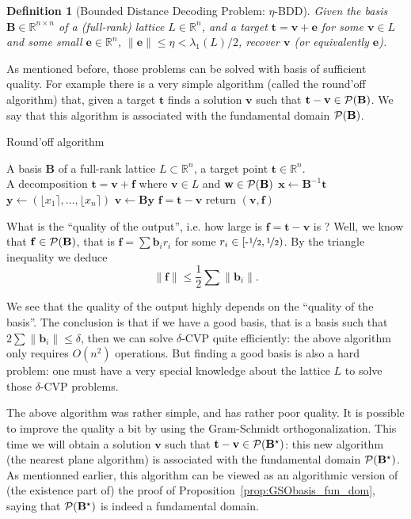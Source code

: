 \documentclass[12pt]{article}
\renewcommand{\vec}{\mathbf}
\newcommand{\R}{\mathbb R}
\newtheorem{definition}{Definition}{\bfseries}{\upshape}
\newcommand{\half}{\ensuremath{\nicefrac 1 2}}
\newcommand{\halfinterval}{\ensuremath{[\mbox{-} \half,\half)}}
\begin{document}
\begin{definition}[Bounded Distance Decoding Problem: $\eta$-BDD]
  Given the basis $\vec B \in \R^{n \times n}$ of a (full-rank) lattice $L \in \R^n$, and a target $\vec t = \vec v + \vec e$ for some $\vec v \in L$ and some small $\vec e \in \R^n$, $\|\vec e\| \leq \eta < \lambda_1(L)/2$, recover $\vec v$ (or equivalently $\vec e$).
\end{definition}

As mentioned before, those problems can be solved with basis of sufficient quality. For example there is a very simple algorithm (called the round'off algorithm) that, given a target $\vec t$ finds a solution $\vec v$ such that $\vec t -\vec v \in \cP(\vec B)$. We say that this algorithm is associated with the fundamental domain $\cP(\vec B)$.


\begin{algorithm}
\caption{Round'off algorithm}
\label{alg:RoundOff}
\begin{algorithmic}[1]
    \REQUIRE A basis $\vec B$ of a full-rank lattice $L \subset \R^n$, a target point $\vec t \in \R^n$. \\
    \ENSURE A decomposition $\vec t = \vec v + \vec f$ where $\vec v \in L$ and $\vec w \in \cP(\vec B)$
  \STATE $\vec x \gets \vec B^{-1} \vec t$ 
  \STATE $\vec y \gets (\lfloor x_1 \rceil, \dots , \lfloor x_n \rceil)$ 
  \STATE $\vec v \gets \vec B \vec y$
  \STATE $\vec f = \vec t - \vec v$
\STATE return $(\vec v, \vec f)$
  \end{algorithmic}
\end{algorithm}

What is the ``quality of the output'', i.e. how large is $\vec f = \vec t - \vec v$ is ? Well, we know that $\vec f \in \cP(\vec B)$, that is $\vec f = \sum \vec b_i r_i$ for some $r_i \in \halfinterval$. By the triangle inequality we deduce
\[\|\vec f\| \leq \frac 1 2 \sum \|\vec b_i\|.\]

  We see that the quality of the output highly depends on the ``quality of the basis''. The conclusion is that if we have a good basis, that is a basis such that $2 \sum \|\vec b_i\| \leq \delta$, then we can solve $\delta$-CVP quite efficiently: the above algorithm only requires $O(n^2)$ operations. But finding a good basis is also a hard problem: one must have a very special knowledge about the lattice $L$ to solve those $\delta$-CVP problems.


The above algorithm was rather simple, and has rather poor quality. It is possible to improve the quality a bit by using the Gram-Schmidt orthogonalization. This time we will obtain a solution $\vec v$ such that $\vec t -\vec v \in \cP(\vec B^\star)$: this new algorithm (the nearest plane algorithm) is associated with the fundamental domain $\cP(\vec B^\star)$. As mentionned earlier, this algorithm can be viewed as an algorithmic version of (the existence part of) the proof of Proposition~\ref{prop:GSObasis_fun_dom}, saying that $\cP(\vec B^\star)$ is indeed a fundamental domain.
\end{document}
